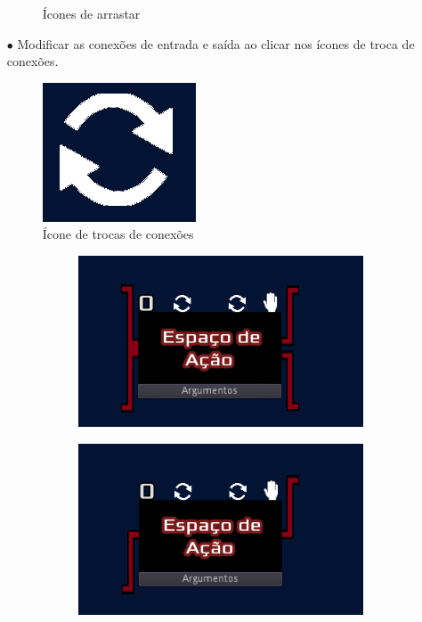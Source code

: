 \begin{itemize}
\begin{figure}[H]
\begin{minipage}{.4\textwidth}
            \end{minipage}
            \caption{Ícones de arrastar}
        \end{figure}
    \item[$\bullet$]
        Modificar as conexões de entrada e saída ao clicar nos ícones de troca de 
        conexões.
        \begin{figure}[H]
            \includegraphics[scale=0.4]{../figuras/change_button.png}
            \caption{Ícone de trocas de conexões}
        \end{figure}
        \begin{figure}[H]
            \centering
            \begin{subfigure}{0.32\textwidth}
                \centering
                \includegraphics[width=1\textwidth]{../figuras/conexao_ex1.png}
            \end{subfigure}
            \begin{subfigure}{0.32\textwidth}
                \centering
                \includegraphics[width=1\textwidth]{../figuras/conexao_ex2.png}

\end{subfigure}
\end{figure}
\end{itemize}
